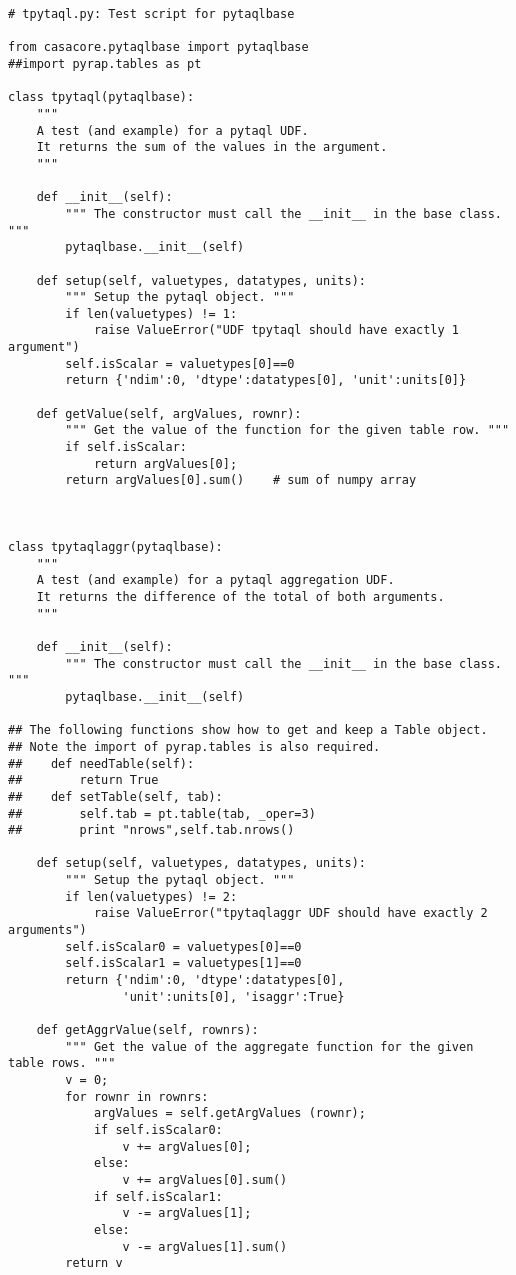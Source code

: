 \begin{verbatim}
# tpytaql.py: Test script for pytaqlbase

from casacore.pytaqlbase import pytaqlbase
##import pyrap.tables as pt

class tpytaql(pytaqlbase):
    """
    A test (and example) for a pytaql UDF.
    It returns the sum of the values in the argument.
    """

    def __init__(self):
        """ The constructor must call the __init__ in the base class. """
        pytaqlbase.__init__(self)

    def setup(self, valuetypes, datatypes, units):
        """ Setup the pytaql object. """
        if len(valuetypes) != 1:
            raise ValueError("UDF tpytaql should have exactly 1 argument")
        self.isScalar = valuetypes[0]==0
        return {'ndim':0, 'dtype':datatypes[0], 'unit':units[0]}

    def getValue(self, argValues, rownr):
        """ Get the value of the function for the given table row. """
        if self.isScalar:
            return argValues[0];
        return argValues[0].sum()    # sum of numpy array



class tpytaqlaggr(pytaqlbase):
    """
    A test (and example) for a pytaql aggregation UDF.
    It returns the difference of the total of both arguments.
    """

    def __init__(self):
        """ The constructor must call the __init__ in the base class. """
        pytaqlbase.__init__(self)

## The following functions show how to get and keep a Table object.
## Note the import of pyrap.tables is also required.
##    def needTable(self):
##        return True
##    def setTable(self, tab):
##        self.tab = pt.table(tab, _oper=3)
##        print "nrows",self.tab.nrows()

    def setup(self, valuetypes, datatypes, units):
        """ Setup the pytaql object. """
        if len(valuetypes) != 2:
            raise ValueError("tpytaqlaggr UDF should have exactly 2 arguments")
        self.isScalar0 = valuetypes[0]==0
        self.isScalar1 = valuetypes[1]==0
        return {'ndim':0, 'dtype':datatypes[0],
                'unit':units[0], 'isaggr':True}

    def getAggrValue(self, rownrs):
        """ Get the value of the aggregate function for the given table rows. """
        v = 0;
        for rownr in rownrs:
            argValues = self.getArgValues (rownr);
            if self.isScalar0:
                v += argValues[0];
            else:
                v += argValues[0].sum()
            if self.isScalar1:
                v -= argValues[1];
            else:
                v -= argValues[1].sum()
        return v
\end{verbatim}


